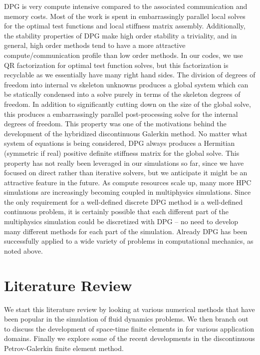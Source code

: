 \documentclass[Dissertation.tex]{subfiles}
\begin{document}
DPG is very compute intensive compared to the associated communication and memory costs.
Most of the work is spent in embarrassingly parallel local solves for the optimal test functions and local stiffness matrix assembly.
Additionally, the stability properties of DPG make high order stability a triviality, and in general, 
high order methods tend to have a more attractive compute/communication profile than low order methods.
In our codes, we use QR factorization for optimal test function solves, but this factorization is recyclable as we essentially have many right hand sides.
The division of degrees of freedom into internal vs skeleton unknowns produces a global system which can be statically condensed into 
a solve purely in terms of the skeleton degrees of freedom.
In addition to significantly cutting down on the size of the global solve, 
this produces a embarrassingly parallel post-processing solve for the internal degrees of freedom.
This property was one of the motivations behind the development of the hybridized discontinuous Galerkin \cite{HDG} method.
No matter what system of equations is being considered, DPG always produces a Hermitian (symmetric if real) 
positive definite stiffness matrix for the global solve.
This property has not really been leveraged in our simulations so far, since we have focused on direct rather than iterative solvers, but we
anticipate it might be an attractive feature in the future.
As compute resources scale up, many more HPC simulations are increasingly becoming coupled in multiphysics simulations.
Since the only requirement for a well-defined discrete DPG method is a well-defined continuous problem, it is certainly possible that each different part of the multiphysics simulation could be discretized with DPG -- no need to develop many different methods for each part of the simulation.
Already DPG has been successfully applied to a wide variety of problems in computational mechanics, as noted above.

\section{Literature Review}
We start this literature review by looking at various numerical methods that have been popular in the simulation of fluid dynamics problems.
We then branch out to discuss the development of space-time finite elements in for various application domains.
Finally we explore some of the recent developments in the discontinuous Petrov-Galerkin finite element method.
\end{document}
